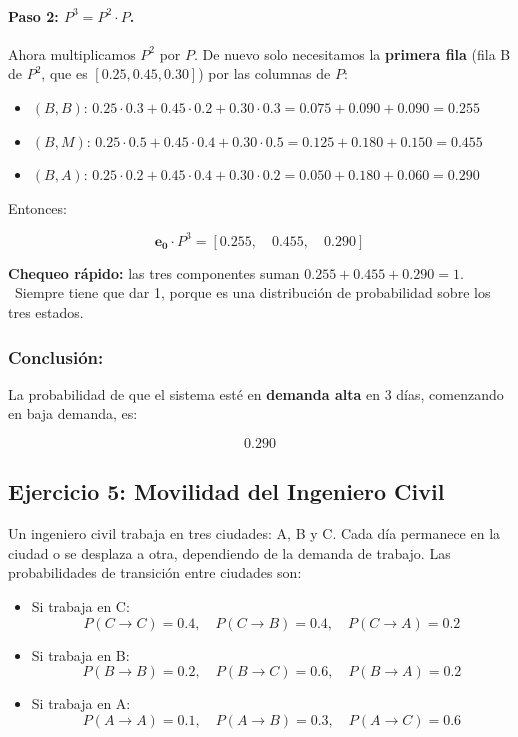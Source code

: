 \documentclass[a4paper,11pt]{article}
\begin{document}
\paragraph{Paso 2: $P^3 = P^2 \cdot P$.} Ahora multiplicamos $P^2$ por $P$. De nuevo solo necesitamos la \textbf{primera fila} (fila B de $P^2$, que es $[0.25, 0.45, 0.30]$) por las columnas de $P$:

\begin{itemize}
    \item $(B,B)$: $0.25 \cdot 0.3 + 0.45 \cdot 0.2 + 0.30 \cdot 0.3 = 0.075 + 0.090 + 0.090 = 0.255$
    \item $(B,M)$: $0.25 \cdot 0.5 + 0.45 \cdot 0.4 + 0.30 \cdot 0.5 = 0.125 + 0.180 + 0.150 = 0.455$
    \item $(B,A)$: $0.25 \cdot 0.2 + 0.45 \cdot 0.4 + 0.30 \cdot 0.2 = 0.050 + 0.180 + 0.060 = 0.290$
\end{itemize}

Entonces:

\[
\mathbf{e_0} \cdot P^3 = [0.255, \quad 0.455, \quad \boxed{0.290}]
\]

\textbf{Chequeo rápido:} las tres componentes suman $0.255 + 0.455 + 0.290 = 1$. \checkmark\ Siempre tiene que dar 1, porque es una distribución de probabilidad sobre los tres estados.

\subsubsection{Conclusión:}

La probabilidad de que el sistema esté en \textbf{demanda alta} en 3 días, comenzando en baja demanda, es:

\[
\boxed{0.290}
\]

\subsection{Ejercicio 5: Movilidad del Ingeniero Civil}

Un ingeniero civil trabaja en tres ciudades: A, B y C. Cada día permanece en la ciudad o se desplaza a otra, dependiendo de la demanda de trabajo. Las probabilidades de transición entre ciudades son:

\begin{itemize}
    \item Si trabaja en C:
    \[
    P(C \rightarrow C) = 0.4, \quad P(C \rightarrow B) = 0.4, \quad P(C \rightarrow A) = 0.2
    \]

    \item Si trabaja en B:
    \[
    P(B \rightarrow B) = 0.2, \quad P(B \rightarrow C) = 0.6, \quad P(B \rightarrow A) = 0.2
    \]

    \item Si trabaja en A:
    \[
    P(A \rightarrow A) = 0.1, \quad P(A \rightarrow B) = 0.3, \quad P(A \rightarrow C) = 0.6
    \]
\end{itemize}
\end{document}
